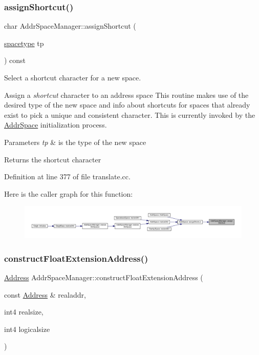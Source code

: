 \subsubsection{\texorpdfstring{assignShortcut()}{assignShortcut()}}
{\footnotesize\ttfamily char Addr\+Space\+Manager\+::assign\+Shortcut (\begin{DoxyParamCaption}\item[{\mbox{\hyperlink{space_8hh_a1a83535cca68b7ca3f25bfad70262231}{spacetype}}}]{tp }\end{DoxyParamCaption}) const}



Select a shortcut character for a new space. 

Assign a {\itshape shortcut} character to an address space This routine makes use of the desired type of the new space and info about shortcuts for spaces that already exist to pick a unique and consistent character. This is currently invoked by the \mbox{\hyperlink{class_addr_space}{Addr\+Space}} initialization process. 
\begin{DoxyParams}{Parameters}
{\em tp} & is the type of the new space \\
\hline
\end{DoxyParams}
\begin{DoxyReturn}{Returns}
the shortcut character 
\end{DoxyReturn}


Definition at line 377 of file translate.\+cc.

Here is the caller graph for this function\+:
\nopagebreak
\begin{figure}[H]
\begin{center}
\leavevmode
\includegraphics[width=350pt]{class_addr_space_manager_a1f464efee6e4c596c6cf1b6209889668_icgraph}
\end{center}
\end{figure}
\mbox{\label{class_addr_space_manager_aed824a71a1d12bb5d167a7a488eb7198}} 
\subsubsection{\texorpdfstring{constructFloatExtensionAddress()}{constructFloatExtensionAddress()}}
{\footnotesize\ttfamily \mbox{\hyperlink{class_address}{Address}} Addr\+Space\+Manager\+::construct\+Float\+Extension\+Address (\begin{DoxyParamCaption}\item[{const \mbox{\hyperlink{class_address}{Address}} \&}]{realaddr,  }\item[{int4}]{realsize,  }\item[{int4}]{logicalsize }\end{DoxyParamCaption})}



